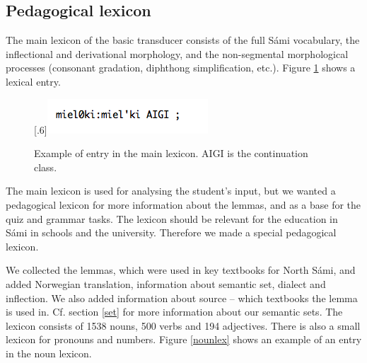 \documentclass[11pt]{article}
\begin{document}
\subsection{Pedagogical lexicon}

The main lexicon of the basic transducer consists of the full Sámi vocabulary, the inflectional and derivational morphology, and the non-segmental morphological processes (consonant gradation, diphthong simplification, etc.). Figure \ref{nounsmelex} shows a lexical entry.

\begin{figure}[htbp]
\begin{center}
\scalebox{.6}[.6]{\includegraphics{presentation/img/noun-sme-lex.png}}\\
\caption{Example of entry in the main lexicon. AIGI is the continuation class.}
\label{nounsmelex}
\end{center}
\end{figure}

The main lexicon is used for analysing the student's input, but we wanted a pedagogical lexicon for more information about the lemmas, and as a base for the quiz and grammar tasks. The lexicon should be relevant for the education in Sámi in schools and the university. Therefore we made a special pedagogical lexicon.

We collected the lemmas, which were used in key textbooks for North Sámi, and added Norwegian translation, information about semantic set, dialect and inflection. We also added information about source -- which textbooks the lemma is used in. Cf. section \ref{set} for more information about our semantic sets. The lexicon consists of 1538 nouns, 500 verbs and 194 adjectives. There is also a small lexicon for pronouns and numbers. Figure \ref{nounlex} shows an example of an entry in the noun lexicon. \\
\end{document}
